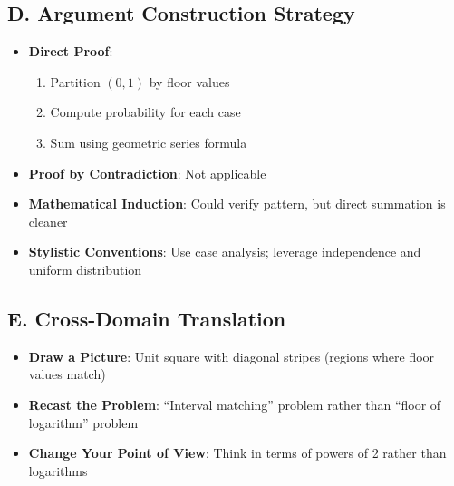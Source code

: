 \documentclass[11pt]{article}
\begin{document}
\begin{strategicbox}
\subsection*{D. Argument Construction Strategy}
\begin{itemize}[leftmargin=*]
    \item \textbf{Direct Proof}: 
    \begin{enumerate}
        \item Partition $(0,1)$ by floor values
        \item Compute probability for each case
        \item Sum using geometric series formula
    \end{enumerate}
    
    \item \textbf{Proof by Contradiction}: Not applicable
    
    \item \textbf{Mathematical Induction}: Could verify pattern, but direct summation is cleaner
    
    \item \textbf{Stylistic Conventions}: Use case analysis; leverage independence and uniform distribution
\end{itemize}

\subsection*{E. Cross-Domain Translation}
\begin{itemize}[leftmargin=*]
    \item \textbf{Draw a Picture}: Unit square with diagonal stripes (regions where floor values match)
    
    \item \textbf{Recast the Problem}: ``Interval matching'' problem rather than ``floor of logarithm'' problem
    
    \item \textbf{Change Your Point of View}: Think in terms of powers of 2 rather than logarithms
\end{itemize}
\end{strategicbox}
\end{document}

